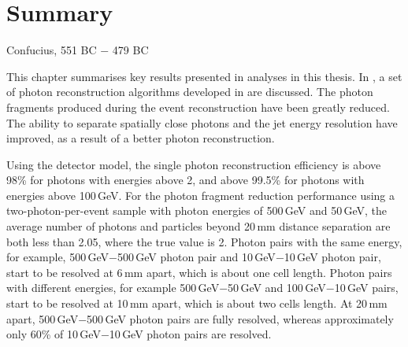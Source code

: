 \chapter{Summary}
\label{chap:summary}



%
{Confucius, 551 BC $-$ 479 BC}





This chapter summarises key results presented in analyses in this thesis. In , a set of photon reconstruction algorithms developed in \pandora are discussed. The photon fragments produced during the event reconstruction have been greatly reduced. The ability to separate spatially close photons and the jet energy resolution have improved, as a result of a better photon reconstruction.

Using the \ILD detector model, the single photon reconstruction efficiency is above 98\% for photons with energies above 2\GeV, and above 99.5\% for photons with energies above 100\,GeV. For the photon fragment reduction performance using a two-photon-per-event sample with photon energies of  500\,GeV and 50\,GeV, the average number of photons and particles beyond 20\,mm distance separation are both less than 2.05, where the true value is 2. Photon pairs with the same energy, for example, 500\,GeV$-$500\,GeV photon pair and 10\,GeV$-$10\,GeV photon pair, start to be resolved at 6\,mm apart, which is about one \ECAL cell length. Photon pairs with different energies, for example 500\,GeV$-$50\,GeV and  100\,GeV$-$10\,GeV pairs, start to be resolved at 10\,mm apart, which is about two \ECAL cells length. At 20\,mm apart, 500\,GeV$-$500\,GeV photon pairs are fully resolved, whereas approximately only 60\% of 10\,GeV$-$10\,GeV photon pairs are resolved.



